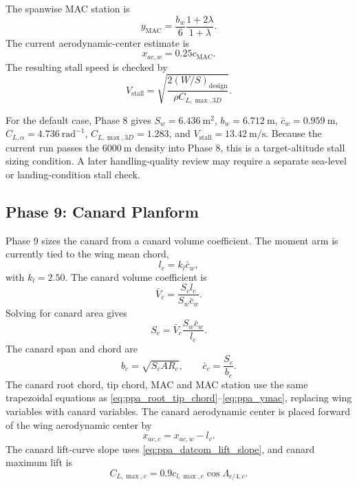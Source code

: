 The spanwise MAC station is
\begin{equation}
    y_{\mathrm{MAC}} =
    \frac{b_w}{6}
    \frac{1+2\lambda}{1+\lambda}.
    \label{eq:ppa_ymac}
\end{equation}
The current aerodynamic-center estimate is
\begin{equation}
    x_{ac,w}=0.25c_{\mathrm{MAC}}.
    \label{eq:ppa_wing_ac}
\end{equation}
The resulting stall speed is checked by
\begin{equation}
    V_{\mathrm{stall}} =
    \sqrt{
    \frac{2(W/S)_{\mathrm{design}}}
    {\rho C_{L,\max,3D}}
    }.
    \label{eq:ppa_stall_speed}
\end{equation}

For the default case, Phase 8 gives \(S_w=6.436~\mathrm{m^2}\), \(b_w=6.712~\mathrm{m}\), \(\bar{c}_w=0.959~\mathrm{m}\), \(C_{L,\alpha}=4.736~\mathrm{rad^{-1}}\), \(C_{L,\max,3D}=1.283\), and \(V_{\mathrm{stall}}=13.42~\mathrm{m/s}\). Because the current run passes the \(6000~\mathrm{m}\) density into Phase 8, this is a target-altitude stall sizing condition. A later handling-quality review may require a separate sea-level or landing-condition stall check.

\subsection{Phase 9: Canard Planform}
\label{subsec:ppa_phase9}

Phase 9 sizes the canard from a canard volume coefficient. The moment arm is currently tied to the wing mean chord,
\begin{equation}
    l_c = k_l \bar{c}_w,
    \label{eq:ppa_canard_arm}
\end{equation}
with \(k_l=2.50\). The canard volume coefficient is
\begin{equation}
    \bar{V}_c =
    \frac{S_c l_c}{S_w\bar{c}_w}.
    \label{eq:ppa_canard_volume}
\end{equation}
Solving for canard area gives
\begin{equation}
    S_c =
    \bar{V}_c
    \frac{S_w\bar{c}_w}{l_c}.
    \label{eq:ppa_canard_area}
\end{equation}
The canard span and chord are
\begin{equation}
    b_c=\sqrt{S_c AR_c},
    \qquad
    \bar{c}_c=\frac{S_c}{b_c}.
    \label{eq:ppa_canard_span_chord}
\end{equation}
The canard root chord, tip chord, MAC and MAC station use the same trapezoidal equations as \autoref{eq:ppa_root_tip_chord}--\autoref{eq:ppa_ymac}, replacing wing variables with canard variables. The canard aerodynamic center is placed forward of the wing aerodynamic center by
\begin{equation}
    x_{ac,c}=x_{ac,w}-l_c.
    \label{eq:ppa_canard_ac}
\end{equation}
The canard lift-curve slope uses \autoref{eq:ppa_datcom_lift_slope}, and canard maximum lift is
\begin{equation}
    C_{L,\max,c}=0.9c_{l,\max,c}\cos\Lambda_{c/4,c}.
    \label{eq:ppa_canard_clmax}
\end{equation}

